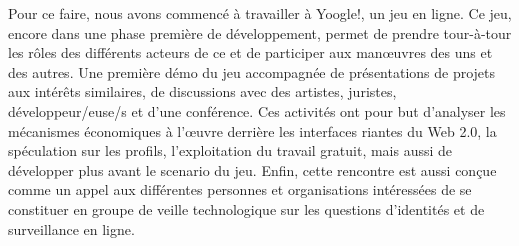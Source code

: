 {{Pour ce faire, nous avons commenc\'e à travailler \`a Yoogle!, un jeu en ligne. Ce jeu, encore dans une phase premi\`ere de d\'eveloppement, permet de prendre tour{}-\`a{}-tour les r\^oles des diff\'erents acteurs de ce  et de participer aux man{\oe}uvres des uns et des autres. Une premi\`ere d\'{e}mo du jeu  accompagn\'ee de pr\'esentations de projets aux int\'er\^ets similaires, de discussions avec des artistes, juristes, d\'eveloppeur/euse/s et d'une conf\'e\-rence. Ces activit\'es ont pour but d'analyser les m\'ecanismes \'economiques \`a l'{\oe}uvre derri\`ere les interfaces riantes du Web 2.0, la sp\'eculation sur les profils, l'exploitation du travail gratuit, mais aussi de d\'evelopper plus avant le scenario du jeu. Enfin, cette rencontre est aussi con\c{c}ue comme un appel aux diff\'erentes personnes et organisations int\'eress\'ees de se constituer en groupe de veille technologique sur les questions d'identit\'es et de surveillance en ligne.

}

}